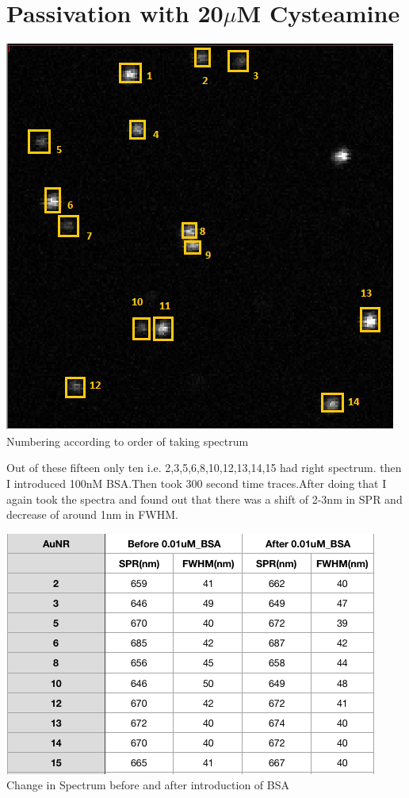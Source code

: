 \documentclass[twoside,single]{lion-msc}
\begin{document}
\section{Passivation with 20$\mu$M Cysteamine}
\begin{center}
\includegraphics[scale=.75]{3.png}\\
Numbering according to order of taking spectrum
\end{center}
Out of these fifteen only ten i.e. 2,3,5,6,8,10,12,13,14,15 had right spectrum.
then I introduced 100nM BSA.Then took 300 second time traces.After doing that I again took the spectra and found out that there was a shift of 2-3nm in SPR and decrease of around 1nm in FWHM.
\begin{center}
\includegraphics[scale=.6]{4.png}\\
Change in Spectrum before and after introduction of BSA
\end{center}
\end{document}
